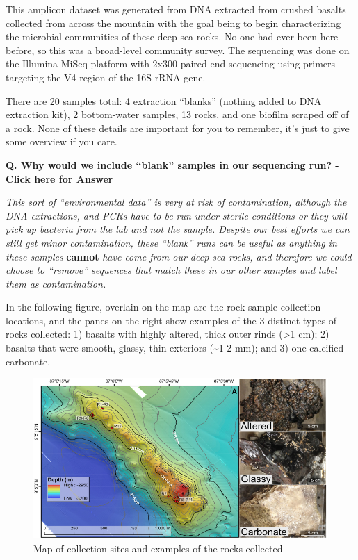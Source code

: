 \documentclass[
]{book}
\begin{document}
This amplicon dataset was generated from DNA extracted from crushed basalts collected from across the mountain with the goal being to begin characterizing the microbial communities of these deep-sea rocks. No one had ever been here before, so this was a broad-level community survey. The sequencing was done on the Illumina MiSeq platform with 2x300 paired-end sequencing using primers targeting the V4 region of the 16S rRNA gene.

There are 20 samples total: 4 extraction ``blanks'' (nothing added to DNA extraction kit), 2 bottom-water samples, 13 rocks, and one biofilm scraped off of a rock. None of these details are important for you to remember, it's just to give some overview if you care.

\textbf{Q. Why would we include ``blank'' samples in our sequencing run? - Click here for Answer}

\emph{This sort of ``environmental data'' is very at risk of contamination, although the DNA extractions, and PCRs have to be run under sterile conditions or they will pick up bacteria from the lab and not the sample. Despite our best efforts we can still get minor contamination, these ``blank'' runs can be useful as anything in these samples} \textbf{cannot} \emph{have come from our deep-sea rocks, and therefore we could choose to ``remove'' sequences that match these in our other samples and label them as contamination.}

In the following figure, overlain on the map are the rock sample collection locations, and the panes on the right show examples of the 3 distinct types of rocks collected: 1) basalts with highly altered, thick outer rinds (\textgreater1 cm); 2) basalts that were smooth, glassy, thin exteriors (\textasciitilde1-2 mm); and 3) one calcified carbonate.

\begin{figure}

{\centering \includegraphics[width=0.8\linewidth]{images/samples} 

}

\caption{Map of collection sites and examples of the rocks collected}\label{fig:nice-fig}
\end{figure}
\end{document}
